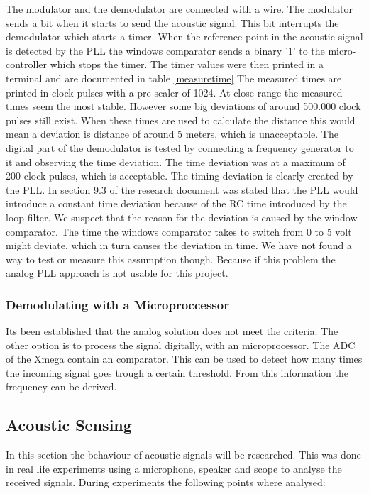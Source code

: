 \documentclass[10pt,a4paper]{article}
\begin{document}
The modulator and the demodulator are connected with a wire. The modulator sends a bit when it starts to send the acoustic signal. This bit interrupts the demodulator which starts a timer. When the reference point in the acoustic signal is detected by the PLL the windows comparator sends a binary '1' to the micro-controller which stops the timer. The timer values were then printed in a terminal and are documented in table \ref{measuretime} The measured times are printed in clock pulses with a pre-scaler of 1024. At close range the measured times seem the most stable. However some big deviations of around 500.000 clock pulses still exist. When these times are used to calculate the distance this would mean a deviation is distance of around 5 meters, which is unacceptable. The digital part of the demodulator is tested by connecting a frequency generator to it and observing the time deviation. The time deviation was at a maximum of 200 clock pulses, which is acceptable. The timing deviation is clearly created by the PLL. In section 9.3 of the research document was stated that the PLL would introduce a constant time deviation because of the RC time introduced by the loop filter. We suspect that the reason for the deviation is caused by the window comparator. The time the windows comparator takes to switch from 0 to 5 volt might deviate, which in turn causes the deviation in time. We have not found a way to test or measure this assumption though. Because if this problem the analog PLL approach is not usable for this project.

\subsubsection{Demodulating with a Microproccessor}
Its been established that the analog solution does not meet the criteria. The other option is to process the signal digitally, with an microprocessor. The ADC of the Xmega contain an comparator. This can be used to detect how many times the incoming signal goes trough a certain threshold. From this information the frequency can be derived.

\subsection{Acoustic Sensing}
In this section the behaviour of acoustic signals will be researched. This was done in real life experiments using a microphone, speaker and scope to analyse the received signals. During experiments the following points where analysed:
\end{document}
